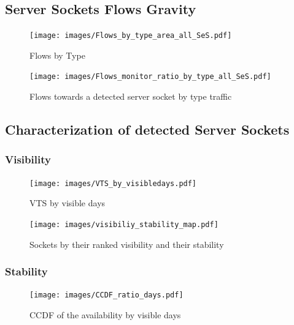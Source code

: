 \subsection{Server Sockets Flows Gravity}


\begin{figure}
	[ht] \centering 
	\texttt{[image: images/Flows\_by\_type\_area\_all\_SeS.pdf]}
	\caption{Flows by Type} 
	\label{fig:flows_by_type} 
\end{figure}


\begin{figure}
	[ht] \centering 
	\texttt{[image: images/Flows\_monitor\_ratio\_by\_type\_all\_SeS.pdf]}
	\caption{Flows towards a detected server socket by type traffic} 
	\label{fig:monitored_flows_by_type} 
\end{figure}


\subsection{Characterization of detected Server Sockets}

\subsubsection{Visibility}
\begin{figure}
	[ht] \centering 
	\texttt{[image: images/VTS\_by\_visibledays.pdf]}
	\caption{VTS by visible days} 
	\label{fig:vts_by_visibledays} 
\end{figure}

\begin{figure}
	[ht] \centering 
	\texttt{[image: images/visibiliy\_stability\_map.pdf]}
	\caption{Sockets by their ranked visibility and their stability} 
	\label{fig:rankedPopularity} 
\end{figure}

\subsubsection{Stability}


\begin{landscape}
\begin{figure}
	[ht] \centering 
	\texttt{[image: images/CCDF\_ratio\_days.pdf]}
	\caption{CCDF of the availability by visible days} 
	\label{fig:ccdf_ratio_days} 
\end{figure}
\end{landscape}

